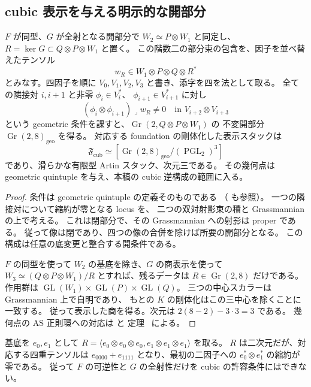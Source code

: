 \subsection{cubic 表示を与える明示的な開部分}

\begin{proposition}
\label{prop:cubic-foundation-open}
$F$ が同型、$G$ が全射となる開部分で $W_2\simeq P\otimes W_1$ と同定し、
$R=\ker G\subset Q\otimes P\otimes W_1$ と置く。
この階数二の部分束の包含を、因子を並べ替えたテンソル
\[
 w_R\in W_1\otimes P\otimes Q\otimes R^*
\]
とみなす。四因子を順に $V_0,V_1,V_2,V_3$ と書き、添字を四を法として取る。
全ての隣接対 $i,i+1$ と非零 $\phi_i\in V_i^*$、
$\phi_{i+1}\in V_{i+1}^*$ に対し
\[
 (\phi_i\otimes\phi_{i+1})\mathbin{\lrcorner}w_R\ne0
 \quad\text{in }V_{i+2}\otimes V_{i+3}
\]
という geometric 条件を課すと、$\operatorname{Gr}(2,Q\otimes P\otimes W_1)$ の
不変開部分 $\operatorname{Gr}(2,8)_{\mathrm{geo}}$ を得る。
対応する foundation の剛体化した表示スタックは
\[
 \mathfrak F_{\mathrm{cub}}
 \simeq[\operatorname{Gr}(2,8)_{\mathrm{geo}}/
         (\operatorname{PGL}_2)^3]
\]
であり、滑らかな有限型 Artin スタック、次元三である。
その幾何点は geometric quintuple を与え、本稿の cubic 逆構成の範囲に入る。
\end{proposition}
\begin{proof}
条件は geometric quintuple の定義そのものである
\cite[Definition 5.3.1]{VdB2011}（\cite[Equation (2.19)]{OU2014} も参照）。
一つの隣接対について縮約が零となる locus を、
二つの双対射影束の積と Grassmannian の上で考える。
これは閉部分で、その Grassmannian への射影は proper である。
従って像は閉であり、四つの像の合併を除けば所要の開部分となる。
この構成は任意の底変更と整合する開条件である。

$F$ の同型を使って $W_2$ の基底を除き、$G$ の商表示を使って
$W_3\simeq(Q\otimes P\otimes W_1)/R$ とすれば、残るデータは
$R\in\operatorname{Gr}(2,8)$ だけである。
作用群は $\operatorname{GL}(W_1)\times\operatorname{GL}(P)\times\operatorname{GL}(Q)$。
三つの中心スカラーは Grassmannian 上で自明であり、
もとの $K$ の剛体化はこの三中心を除くことに一致する。
従って表示した商を得る。次元は $2(8-2)-3\cdot3=3$ である。
幾何点の AS 正則環への対応は \cite[Lemma 5.4.12, Theorem 5.5.10]{VdB2011} と
定理~\cite[\texttt{thm:all-admissible-inverse}]{QuadricIntrinsic2026} による。
\end{proof}

\begin{example}
基底を $e_0,e_1$ として
$R=\langle e_0\otimes e_0\otimes e_0,
          e_1\otimes e_1\otimes e_1\rangle$ を取る。
$R$ は二次元だが、対応する四重テンソルは
$e_{0000}+e_{1111}$ となり、最初の二因子への
$e_0^*\otimes e_1^*$ の縮約が零である。
従って $F$ の可逆性と $G$ の全射性だけを cubic の許容条件にはできない。
\end{example}

